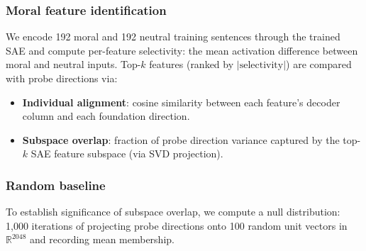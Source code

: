 \subsubsection{Moral feature identification}\label{moral-feature-identification}

We encode 192 moral and 192 neutral training sentences through the trained SAE and compute per-feature selectivity: the mean activation difference between moral and neutral inputs.
Top-\(k\) features (ranked by \(|\text{selectivity}|\)) are compared with probe directions via:

\begin{itemize}
\tightlist
\item
  \textbf{Individual alignment}: cosine similarity between each feature's decoder column and each foundation direction.
\item
  \textbf{Subspace overlap}: fraction of probe direction variance captured by the top-\(k\) SAE feature subspace (via SVD projection).
\end{itemize}

\subsubsection{Random baseline}\label{random-baseline}

To establish significance of subspace overlap, we compute a null distribution: 1,000 iterations of projecting probe directions onto 100 random unit vectors in \(\mathbb{R}^{2048}\) and recording mean membership.
